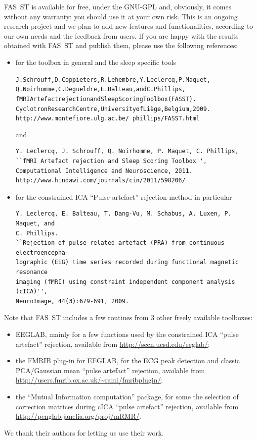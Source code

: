 \documentclass[a4paper,titlepage]{article}
\def\dblS{\hbox{S\hskip -4.5pt S}}
\newcommand{\bi}{\begin{itemize}}
\newcommand{\ei}{\end{itemize}}
\newcommand{\fasst}{FA\dblS T } 	%
\begin{document}
\fasst is available for free, under the GNU-GPL and, obviously, it comes without any warranty: you should use it at your own risk. This is an ongoing research project and we plan to add new features and functionalities, according to our own needs and the feedback from users. If you are happy with the results obtained with \fasst and publish them, please use the following references:
\bi
\item for the toolbox in general and the sleep specific tools\cite{CRCtb,Leclercq2011}
\begin{alltt}
J. Schrouff, D. Coppieters, R. Lehembre, Y. Leclercq, P. Maquet,
Q. Noirhomme, C. Degueldre, E. Balteau, and C. Phillips,
fMRI Artefact rejection and Sleep Scoring Toolbox (FASST).
Cyclotron Research Centre, University of Li\`ege, Belgium, 2009.
http://www.montefiore.ulg.ac.be/~phillips/FASST.html
\end{alltt}
and
\begin{verbatim}
Y. Leclercq, J. Schrouff, Q. Noirhomme, P. Maquet, C. Phillips,
``fMRI Artefact rejection and Sleep Scoring Toolbox'',
Computational Intelligence and Neuroscience, 2011.
http://www.hindawi.com/journals/cin/2011/598206/
\end{verbatim}
\item for the constrained ICA ``Pulse artefact'' rejection method\cite{Leclercq2009} in particular
\begin{verbatim}
Y. Leclercq, E. Balteau, T. Dang-Vu, M. Schabus, A. Luxen, P. Maquet, and
C. Phillips.
``Rejection of pulse related artefact (PRA) from continuous electroencepha-
lographic (EEG) time series recorded during functional magnetic resonance
imaging (fMRI) using constraint independent component analysis (cICA)'',
NeuroImage, 44(3):679-691, 2009.
\end{verbatim}
\ei
Note that \fasst includes a few routines from 3 other freely available toolboxes:
\bi
\item EEGLAB\cite{Delorme2004,Delorme2011}, mainly for a few functions used by the constrained ICA ``pulse artefact'' rejection, available from \url{http://sccn.ucsd.edu/eeglab/};
\item the FMRIB plug-in for EEGLAB\cite{FMRIBplugin}, for the ECG peak detection and classic PCA/Gaussian mean ``pulse artefact'' rejection, available from \url{http://users.fmrib.ox.ac.uk/~rami/fmribplugin/}; 
\item the ``Mutual Information computation'' package\cite{Peng2005}, for some the selection of correction matrices during cICA ``pulse artefact'' rejection, available from \url{http://penglab.janelia.org/proj/mRMR/}.
\ei
We thank their authors for letting us use their work.
\end{document}
